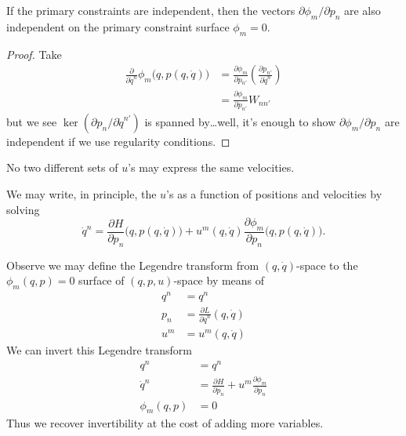 \begin{proposition}
If the primary constraints are independent, then the vectors
$\partial\phi_{m}/\partial p_{n}$ are also independent on the primary
constraint surface $\phi_{m}=0$.
\end{proposition}
\begin{proof}
Take
\begin{equation}
\begin{split}
\frac{\partial}{\partial\dot{q}^{n}}\phi_{m}\bigl(q, p(q, \dot{q})\bigr)
&=\frac{\partial\phi_{m}}{\partial p_{n'}}\left(\frac{\partial p_{n'}}{\partial\dot{q}^{n}}\right)\\  
&=\frac{\partial\phi_{m}}{\partial p_{n'}}W_{nn'}
\end{split}
\end{equation}
but we see $\ker(\partial p_{n}/\partial\dot{q}^{n'})$ is spanned
by\dots well, it's enough to show $\partial\phi_{m}/\partial p_{n}$ are
independent if we use regularity conditions.
\end{proof}
\begin{corollary}
No two different sets of $u$'s may express the same velocities.
\end{corollary}

\M
We may write, in principle, the $u$'s as a function of positions and
velocities by solving
\begin{equation}
\dot{q}^{n} = \frac{\partial H}{\partial p_{n}}\bigl(q, p(q,\dot{q})\bigr)
+ u^{m}(q, \dot{q})%
\frac{\partial\phi_{m}}{\partial p_{n}}\bigl(q, p(q,\dot{q})\bigr).
\end{equation}

\M
Observe we may define the Legendre transform from $(q,\dot{q})$-space to
the $\phi_{m}(q,p)=0$ surface of $(q,p,u)$-space by means of
\begin{subequations}
\begin{align}
q^{n} &= q^{n}\\
p_{n} &= \frac{\partial L}{\partial\dot{q}^{n}}(q,\dot{q})\\
u^{m} &= u^{m}(q, \dot{q})
\end{align}
\end{subequations}
We can invert this Legendre transform
\begin{subequations}
\begin{align}
q^{n}         &= q^{n}\\
\dot{q}^{n}   &= \frac{\partial H}{\partial p_{n}} +
                 u^{m}\frac{\partial\phi_{m}}{\partial p_{n}}\\
\phi_{m}(q,p) &= 0
\end{align}
\end{subequations}
Thus we recover invertibility at the cost of adding more variables.

